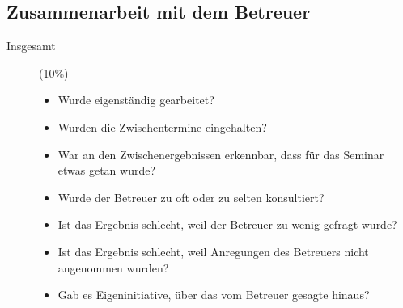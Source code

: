 \documentclass[final,bibliography=totocnumbered]{include/sikseminar}
\begin{document}
\subsection{Zusammenarbeit mit dem Betreuer}
\begin{description}
  \item[Insgesamt] (10\%)
    \begin{itemize}
      \item Wurde eigenständig gearbeitet?
	  \item Wurden die Zwischentermine eingehalten?
	  \item War an den Zwischenergebnissen erkennbar, dass für das Seminar etwas getan wurde?
      \item Wurde der Betreuer zu oft oder zu selten konsultiert?
      \item Ist das Ergebnis schlecht, weil der Betreuer zu wenig gefragt wurde?
      \item Ist das Ergebnis schlecht, weil Anregungen des Betreuers nicht angenommen wurden?
      \item Gab es Eigeninitiative, über das vom Betreuer gesagte hinaus?
    \end{itemize}
\end{description}





\nocite{*}
\printbibliography

\listoftodos
\end{document}
